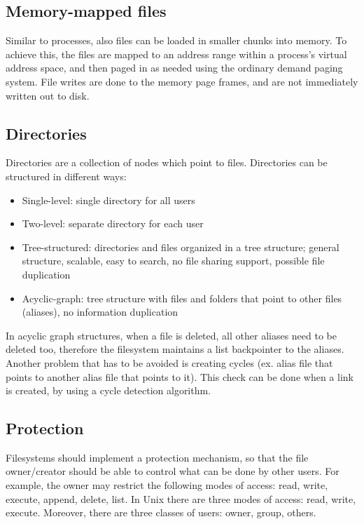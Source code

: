 \subsection{Memory-mapped files}
Similar to processes, also files can be loaded in smaller chunks into memory. To achieve this, the files are mapped to an address range within a process's virtual address space, and then paged in as needed using the ordinary demand paging system. File writes are done to the memory page frames, and are not immediately written out to disk.

\subsection{Directories}
Directories are a collection of nodes which point to files. Directories can be structured in different ways:
\begin{itemize}
    \item Single-level: single directory for all users
    \item Two-level: separate directory for each user
    \item Tree-structured: directories and files organized in a tree structure; general structure, scalable, easy to search, no file sharing support, possible file duplication
    \item Acyclic-graph: tree structure with files and folders that point to other files (aliases), no information duplication
\end{itemize}

In acyclic graph structures, when a file is deleted, all other aliases need to be deleted too, therefore the filesystem maintains a list backpointer to the aliases. Another problem that has to be avoided is creating cycles (ex. alias file that points to another alias file that points to it). This check can be done when a link is created, by using a cycle detection algorithm.

\subsection{Protection}
Filesystems should implement a protection mechanism, so that the file owner/creator should be able to control what can be done by other users. For example, the owner may restrict the following modes of access: read, write, execute, append, delete, list. In Unix there are three modes of access: read, write, execute. Moreover, there are three classes of users: owner, group, others.

